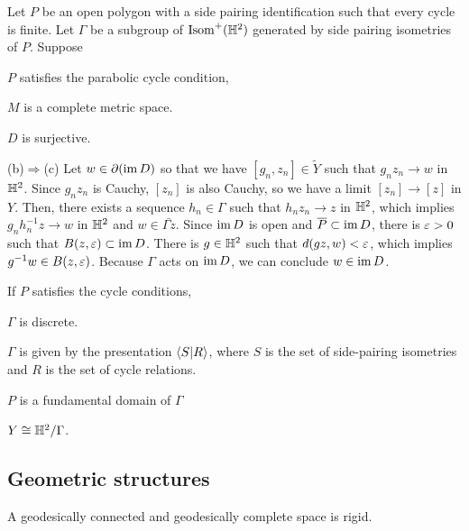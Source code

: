 \documentclass[a4paper]{article}
\begin{document}
\begin{prb}
Let $P$ be an open polygon with a side pairing identification such that every cycle is finite.
Let $\Gamma$ be a subgroup of $\operatorname{Isom}^+(\mathbb{H}^2)$ generated by side pairing isometries of $P$.
Suppose 
\begin{parts}
\item $P$ satisfies the parabolic cycle condition,
\item $M$ is a complete metric space.
\item $D$ is surjective.
\end{parts}
\end{prb}
\begin{pf}
(b)$\Rightarrow$(c)
Let $w\in\partial(\operatorname{im} D)$ so that we have $[g_n,z_n]\in\tilde Y$ such that $g_nz_n\to w$ in $\mathbb{H}^2$.
Since $g_nz_n$ is Cauchy, $[z_n]$ is also Cauchy, so we have a limit $[z_n]\to[z]$ in $Y$.
Then, there exists a sequence $h_n\in\Gamma$ such that $h_nz_n\to z$ in $\mathbb{H}^2$, which implies $g_nh_n^{-1}z\to w$ in $\mathbb{H}^2$ and $w\in\bar{\Gamma z}$.
Since $\operatorname{im} D$ is open and $\overline P\subset\operatorname{im} D$, there is $\varepsilon>0$ such that $B(z,\varepsilon)\subset\operatorname{im} D$.
There is $g\in\mathbb{H}^2$ such that $d(gz,w)<\varepsilon$, which implies $g^{-1}w\in B(z,\varepsilon)$.
Because $\Gamma$ acts on $\operatorname{im} D$, we can conclude $w\in\operatorname{im} D$.
\end{pf}

If $P$ satisfies the cycle conditions,
\begin{parts}
\item $\Gamma$ is discrete.
\item $\Gamma$ is given by the presentation $\langle S|R\rangle$, where $S$ is the set of side-pairing isometries and $R$ is the set of cycle relations.
\item $P$ is a fundamental domain of $\Gamma$
\item $Y\cong\mathbb{H}^2/\Gamma$.
\end{parts}



\subsection{Geometric structures}





A geodesically connected and geodesically complete space is rigid.
\end{document}
